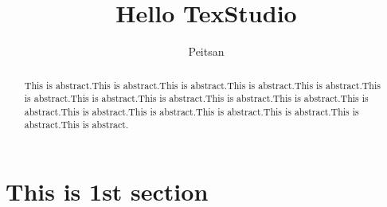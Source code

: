 \documentclass[]{article}
\title{Hello TexStudio}
\author{Peitsan}
\begin{document}
\maketitle

\begin{abstract}
	This is abstract.This is abstract.This is abstract.This is abstract.This is abstract.This is abstract.This is abstract.This is abstract.This is abstract.This is abstract.This is abstract.This is abstract.This is abstract.This is abstract.This is abstract.This is abstract.This is abstract.
\end{abstract}

\section{This is 1st section}
\end{document}
